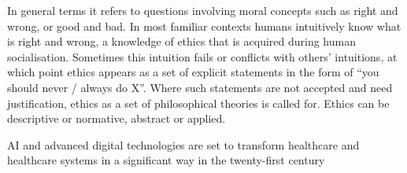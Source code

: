 \documentclass[paper=a4, fontsize=11pt]{scrartcl} %
\numberwithin{equation}{section} %
\numberwithin{figure}{section} %
\numberwithin{table}{section} %
\begin{document}
In general terms it refers to questions involving moral concepts such as right and wrong, or good and bad. 
In most familiar contexts humans intuitively know what is right and wrong, a knowledge of ethics that is acquired during human socialisation.
Sometimes this intuition fails or conflicts with others’ intuitions, at which point ethics appears as a set 
of explicit statements in the form of “you should never / always do X”. Where such statements are not accepted and need justification, 
ethics as a set of philosophical theories is called for. Ethics can be descriptive or normative, abstract or applied.







AI and advanced digital technologies are set to transform healthcare and healthcare systems in a significant way in the twenty-first century
























\end{document}

